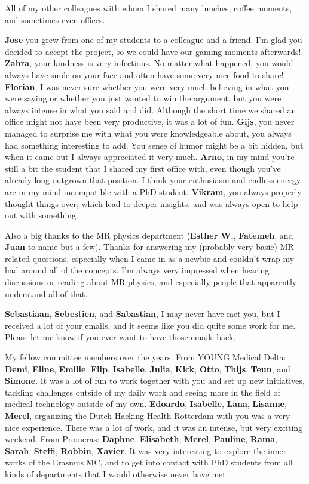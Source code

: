 All of my other colleagues with whom I shared many lunches, coffee moments, and sometimes even offices.

\textbf{Jose} you grew from one of my students to a colleague and a friend.
I'm glad you decided to accept the project, so we could have our gaming moments afterwards!
\textbf{Zahra}, your kindness is very infectious.
No matter what happened, you would always have smile on your face and often have some very nice food to share!
\textbf{Florian}, I was never sure whether you were very much believing in what you were saying or whether you just wanted to win the argument, but you were always intense in what you said and did.
Although the short time we shared an office might not have been very productive, it was a lot of fun.
\textbf{Gijs}, you never managed to surprise me with what you were knowledgeable about, you always had something interesting to add.
You sense of humor might be a bit hidden, but when it came out I always appreciated it very much.
\textbf{Arno}, in my mind you're still a bit the student that I shared my first office with, even though you've already long outgrown that position.
I think your enthusiasm and endless energy are in my mind incompatible with a PhD student.
\textbf{Vikram}, you always properly thought things over, which lead to deeper insights, and was always open to help out with something.

Also a big thanks to the MR physics department (\textbf{Esther W.}, \textbf{Fatemeh}, and \textbf{Juan} to name but a few).
Thanks for answering my (probably very basic) MR-related questions, especially when I came in as a newbie and couldn't wrap my had around all of the concepts.
I'm always very impressed when hearing discussions or reading about MR physics, and especially people that apparently understand all of that.

\textbf{Sebastiaan}, \textbf{Sebestien}, and \textbf{Sabastian}, I may never have met you, but I received a lot of your emails, and it seems like you did quite some work for me.
Please let me know if you ever want to have those emails back.

My fellow committee members over the years.
From YOUNG Medical Delta: \textbf{Demi}, \textbf{Eline}, \textbf{Emilie}, \textbf{Flip}, \textbf{Isabelle}, \textbf{Julia}, \textbf{Kick}, \textbf{Otto}, \textbf{Thijs}, \textbf{Teun}, and \textbf{Simone}.
It was a lot of fun to work together with you and set up new initiatives, tackling challenges outside of my daily work and seeing more in the field of medical technology outside of my own.
\textbf{Edoardo}, \textbf{Isabelle}, \textbf{Lana}, \textbf{Lisanne}, \textbf{Merel}, organizing the Dutch Hacking Health Rotterdam with you was a very nice experience.
There was a lot of work, and it was an intense, but very exciting weekend.
From Promeras: \textbf{Daphne}, \textbf{Elisabeth}, \textbf{Merel}, \textbf{Pauline}, \textbf{Rama}, \textbf{Sarah}, \textbf{Steffi}, \textbf{Robbin}, \textbf{Xavier}.
It was very interesting to explore the inner works of the Erasmus MC, and to get into contact with PhD students from all kinds of departments that I would otherwise never have met.


